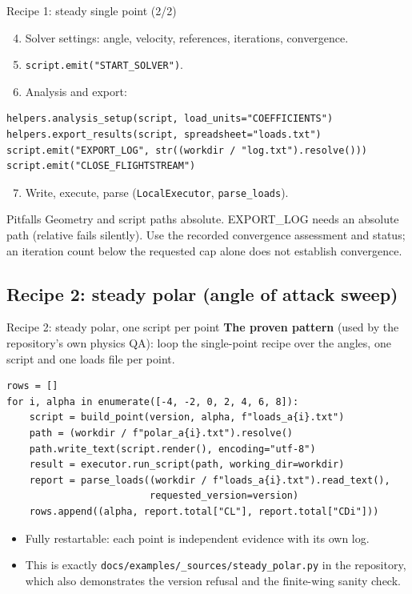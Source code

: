 \documentclass[aspectratio=169,10pt]{beamer}
\newcommand{\code}[1]{\texttt{\small #1}}
\begin{document}
\begin{frame}[fragile]{Recipe 1: steady single point (2/2)}
  \begin{enumerate}
    \setcounter{enumi}{3}
    \item Solver settings: angle, velocity, references, iterations, convergence.
    \item \code{script.emit("START\_SOLVER")}.
    \item Analysis and export:
  \end{enumerate}
\begin{lstlisting}
helpers.analysis_setup(script, load_units="COEFFICIENTS")
helpers.export_results(script, spreadsheet="loads.txt")
script.emit("EXPORT_LOG", str((workdir / "log.txt").resolve()))
script.emit("CLOSE_FLIGHTSTREAM")
\end{lstlisting}
  \begin{enumerate}
    \setcounter{enumi}{6}
    \item Write, execute, parse (\code{LocalExecutor}, \code{parse\_loads}).
  \end{enumerate}
  \begin{alertblock}{Pitfalls}
    Geometry and script paths absolute. EXPORT\_LOG needs an absolute path (relative fails silently). Use the recorded convergence assessment and status; an iteration count below the requested cap alone does not establish convergence.
  \end{alertblock}
\end{frame}

\subsection{Recipe 2: steady polar (angle of attack sweep)}

\begin{frame}[fragile]{Recipe 2: steady polar, one script per point}
  \textbf{The proven pattern} (used by the repository's own physics QA): loop the single-point recipe over the angles, one script and one loads file per point.
\begin{lstlisting}
rows = []
for i, alpha in enumerate([-4, -2, 0, 2, 4, 6, 8]):
    script = build_point(version, alpha, f"loads_a{i}.txt")
    path = (workdir / f"polar_a{i}.txt").resolve()
    path.write_text(script.render(), encoding="utf-8")
    result = executor.run_script(path, working_dir=workdir)
    report = parse_loads((workdir / f"loads_a{i}.txt").read_text(),
                         requested_version=version)
    rows.append((alpha, report.total["CL"], report.total["CDi"]))
\end{lstlisting}
  \begin{itemize}
    \item Fully restartable: each point is independent evidence with its own log.
    \item This is exactly \code{docs/examples/\_sources/steady\_polar.py} in the repository, which also demonstrates the version refusal and the finite-wing sanity check.
  \end{itemize}
\end{frame}
\end{document}
